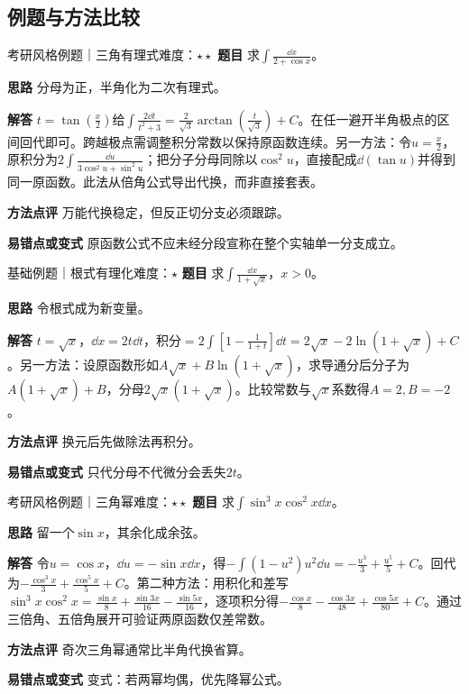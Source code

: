 \subsection{例题与方法比较}
\begin{example}{考研风格例题｜三角有理式}{难度：$\star\star$}
\label{ex:3:7}\textbf{题目} 求$\int\frac{\dd x}{2+\cos x}$。\par
\textbf{思路} 分母为正，半角化为二次有理式。\par
\textbf{解答} $t=\tan(\frac{x}{2})$给$\int\frac{2\dd t}{t^2+3}=\frac2{\sqrt3}\arctan(\frac{t}{\sqrt3})+C$。在任一避开半角极点的区间回代即可。跨越极点需调整积分常数以保持原函数连续。另一方法：令$u=\frac{x}{2}$，原积分为$2\int\frac{\dd u}{3\cos^2u+\sin^2u}$；把分子分母同除以$\cos^2u$，直接配成$\dd(\tan u)$并得到同一原函数。此法从倍角公式导出代换，而非直接套表。\par
\textbf{方法点评} 万能代换稳定，但反正切分支必须跟踪。\par
\textbf{易错点或变式} 原函数公式不应未经分段宣称在整个实轴单一分支成立。
\end{example}
\begin{example}{基础例题｜根式有理化}{难度：$\star$}
\label{ex:3:8}\textbf{题目} 求$\int\frac{\dd x}{1+\sqrt x}$，$x>0$。\par
\textbf{思路} 令根式成为新变量。\par
\textbf{解答} $t=\sqrt x$，$\dd x=2t\dd t$，积分$=2\int[1-\frac{1}{1+t}]\dd t=2\sqrt x-2\ln(1+\sqrt x)+C$。另一方法：设原函数形如$A\sqrt x+B\ln(1+\sqrt x)$，求导通分后分子为$A(1+\sqrt x)+B$，分母$2\sqrt x(1+\sqrt x)$。比较常数与$\sqrt x$系数得$A=2,B=-2$。\par
\textbf{方法点评} 换元后先做除法再积分。\par
\textbf{易错点或变式} 只代分母不代微分会丢失$2t$。
\end{example}
\begin{example}{考研风格例题｜三角幂}{难度：$\star\star$}
\label{ex:3:9}\textbf{题目} 求$\int\sin^3x\cos^2x\dd x$。\par
\textbf{思路} 留一个$\sin x$，其余化成余弦。\par
\textbf{解答} 令$u=\cos x$，$\dd u=-\sin x\dd x$，得$-\int(1-u^2)u^2\dd u=-\frac{u^3}{3}+\frac{u^5}{5}+C$。回代为$-\frac{\cos^3x}{3}+\frac{\cos^5x}{5}+C$。第二种方法：用积化和差写$\sin^3x\cos^2x=\frac{\sin x}{8}+\frac{\sin3x}{16}-\frac{\sin5x}{16}$，逐项积分得$-\frac{\cos x}{8}-\frac{\cos3x}{48}+\frac{\cos5x}{80}+C$。通过三倍角、五倍角展开可验证两原函数仅差常数。\par
\textbf{方法点评} 奇次三角幂通常比半角代换省算。\par
\textbf{易错点或变式} 变式：若两幂均偶，优先降幂公式。
\end{example}
